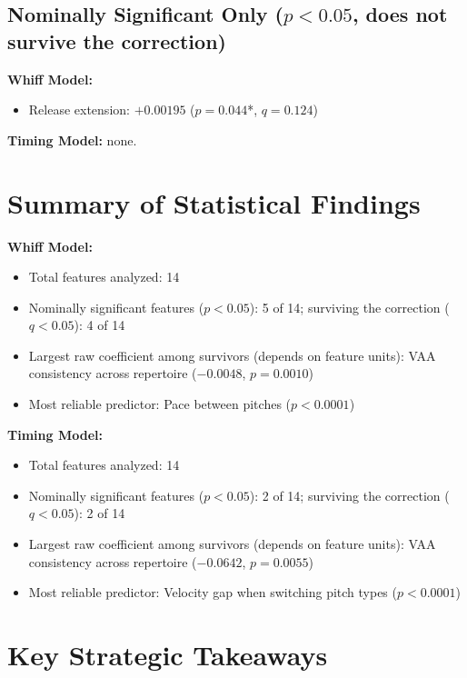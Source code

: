 \documentclass[11pt]{article}
\begin{document}
\subsection*{Nominally Significant Only ($p<0.05$, does not survive the correction)}

\textbf{Whiff Model:}
\begin{itemize}
\item Release extension: $+0.00195$ ($p=0.044$*, $q=0.124$)
\end{itemize}

\textbf{Timing Model:} none.

\section*{Summary of Statistical Findings}

\textbf{Whiff Model:}
\begin{itemize}
\item Total features analyzed: 14
\item Nominally significant features ($p<0.05$): 5 of 14; surviving the correction ($q<0.05$): 4 of 14
\item Largest raw coefficient among survivors (depends on feature units): VAA consistency across repertoire ($-0.0048$, $p=0.0010$)
\item Most reliable predictor: Pace between pitches ($p<0.0001$)
\end{itemize}

\textbf{Timing Model:}
\begin{itemize}
\item Total features analyzed: 14
\item Nominally significant features ($p<0.05$): 2 of 14; surviving the correction ($q<0.05$): 2 of 14
\item Largest raw coefficient among survivors (depends on feature units): VAA consistency across repertoire ($-0.0642$, $p=0.0055$)
\item Most reliable predictor: Velocity gap when switching pitch types ($p<0.0001$)
\end{itemize}

\section*{Key Strategic Takeaways}
\end{document}
